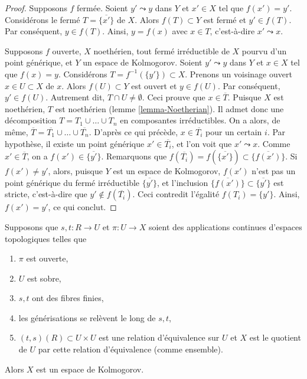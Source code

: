 \begin{proof}
Supposons $f$ fermée. Soient $y' \leadsto y$ dans $Y$ et $x'\in X$ tel que
$f(x') = y'$. Considérons le fermé $T = \overline{\{x'\}}$ de $X$.
Alors $f(T) \subset Y$ est fermé et $y' \in f(T)$. Par conséquent,
$y \in f(T)$. Ainsi, $y = f(x)$ avec $x \in T$, c'est-à-dire
$x' \leadsto x$.

\medskip\noindent
Supposons $f$ ouverte, $X$ noethérien, tout fermé irréductible de $X$ pourvu
d'un point générique, et $Y$ un espace de Kolmogorov.
Soient $y' \leadsto y$ dans $Y$ et $x \in X$ tel que $f(x) = y$.
Considérons $T = f^{-1}(\{y'\}) \subset X$.
Prenons un voisinage ouvert $x \in U \subset X$ de $x$.
Alors $f(U) \subset Y$ est ouvert et $y \in f(U)$. Par conséquent,
$y' \in f(U)$. Autrement dit, $T \cap U \not = \emptyset$. Ceci prouve que
$x \in \overline{T}$. Puisque $X$ est noethérien, $T$ est noethérien
(lemme \ref{lemma-Noetherian}).
Il admet donc une décomposition $T = T_1 \cup \ldots \cup T_n$ en composantes
irréductibles. On a alors, de même,
$\overline{T} = \overline{T_1} \cup \ldots \cup \overline{T_n}$.
D'après ce qui précède, $x \in \overline{T_i}$ pour un certain $i$. Par
hypothèse, il existe un point générique $x' \in \overline{T_i}$, et l'on voit
que $x' \leadsto x$. Comme $x' \in \overline{T}$, on a
$f(x') \in \overline{\{y'\}}$. Remarquons que
$f(\overline{T_i}) = f(\overline{\{x'\}}) \subset \overline{\{f(x')\}}$.
Si $f(x') \not = y'$, alors, puisque $Y$ est un espace de Kolmogorov, $f(x')$ n'est pas
un point générique du fermé irréductible $\overline{\{y'\}}$, et l'inclusion
$\overline{\{f(x')\}} \subset \overline{\{y'\}}$ est stricte, c'est-à-dire
que $y' \not \in f(\overline{T_i})$.
Ceci contredit l'égalité $f(T_i) = \{y'\}$.
Ainsi, $f(x') = y'$, ce qui conclut.
\end{proof}

\begin{lemma}
\label{lemma-quotient-kolmogorov}
Supposons que $s, t : R \to U$ et $\pi : U \to X$ soient des applications
continues d'espaces topologiques telles que
\begin{enumerate}
\item $\pi$ est ouverte,
\item $U$ est sobre,
\item $s, t$ ont des fibres finies,
\item les générisations se relèvent le long de $s, t$,
\item $(t, s)(R) \subset U \times U$ est une relation d'équivalence sur $U$ et
$X$ est le quotient de $U$ par cette relation d'équivalence (comme ensemble).
\end{enumerate}
Alors $X$ est un espace de Kolmogorov.
\end{lemma}

